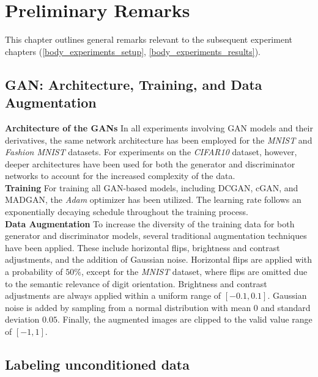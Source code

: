 \section{Preliminary Remarks}\label{body_prelim}
This chapter outlines general remarks relevant to the subsequent experiment chapters (\ref{body_experiments_setup}, \ref{body_experiments_results}).

\subsection{GAN: Architecture, Training, and Data Augmentation}

\noindent\textbf{Architecture of the GANs}
In all experiments involving GAN models and their derivatives, the same network architecture has been employed for the \textit{MNIST} and \textit{Fashion MNIST} datasets. For experiments on the \textit{CIFAR10} dataset, however, deeper architectures have been used for both the generator and discriminator networks to account for the increased complexity of the data.\\

\noindent\textbf{Training}
For training all GAN-based models, including DCGAN, cGAN, and MADGAN, the \textit{Adam} optimizer has been utilized. The learning rate follows an exponentially decaying schedule throughout the training process.\\

\noindent\textbf{Data Augmentation}
To increase the diversity of the training data for both generator and discriminator models, several traditional augmentation techniques have been applied. These include horizontal flips, brightness and contrast adjustments, and the addition of Gaussian noise.
Horizontal flips are applied with a probability of \(50\%\), except for the \textit{MNIST} dataset, where flips are omitted due to the semantic relevance of digit orientation. Brightness and contrast adjustments are always applied within a uniform range of \([-0.1, 0.1]\). Gaussian noise is added by sampling from a normal distribution with mean \(0\) and standard deviation \(0.05\). Finally, the augmented images are clipped to the valid value range of \([-1, 1]\).


\subsection{Labeling unconditioned data}

